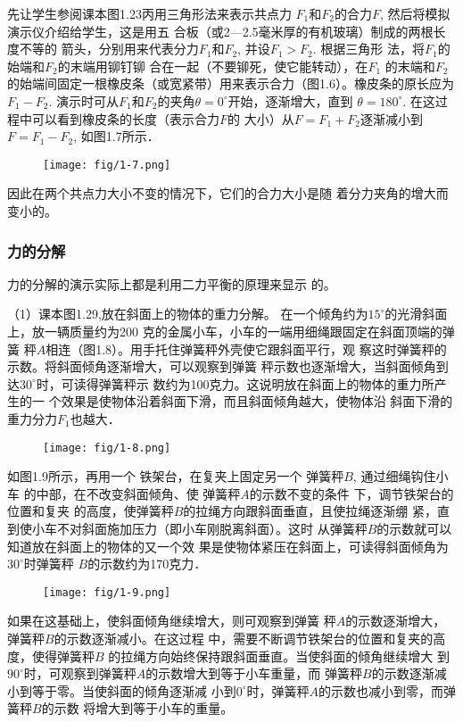 先让学生参阅课本图1.23丙用三角形法来表示共点力
$F_1$和$F_2$的合力$F$, 然后将模拟演示仪介绍给学生，这是用五
合板（或2—2.5毫米厚的有机玻璃）制成的两根长度不等的
箭头，分别用来代表分力$F_1$和$F_2$, 并设$F_1>F_2$. 根据三角形
法，将$F_1$的始端和$F_2$的末端用铆钉铆
合在一起（不要铆死，使它能转动），在$F_1$
的末端和$F_2$的始端间固定一根橡皮条（或宽紧带）用来表示合力（图1.6）。橡皮条的原长应为$F_1-F_2$. 演示时可从$F_1$和$F_2$的夹角$\theta=0^{\circ}$开始，逐渐增大，直到
$\theta=180^{\circ}$. 在这过程中可以看到橡皮条的长度（表示合力$F$的
大小）从$F=F_1+F_2$逐渐减小到$F=F_1-F_2$, 如图1.7所示．
\begin{figure}[htp]
    \centering
    \texttt{[image: fig/1-7.png]}
    \caption{}
\end{figure}
因此在两个共点力大小不变的情况下，它们的合力大小是随
着分力夹角的增大而变小的。

\subsubsection{力的分解}
力的分解的演示实际上都是利用二力平衡的原理来显示
的。

（1）课本图1.29,放在斜面上的物体的重力分解。
在一个倾角约为$15^{\circ}$的光滑斜面上，放一辆质量约为200
克的金属小车，小车的一端用细绳跟固定在斜面顶端的弹簧
秤$A$相连（图1.8）。用手托住弹簧秤外壳使它跟斜面平行，观
察这时弹簧秤的示数。将斜面倾角逐渐增大，可以观察到弹簧
秤示数也逐渐增大，当斜面倾角到达$30^{\circ}$时，可读得弹簧秤示
数约为100克力。这说明放在斜面上的物体的重力所产生的一
个效果是使物体沿着斜面下滑，而且斜面倾角越大，使物体沿
斜面下滑的重力分力$F_1$也越大．
\begin{figure}[htp]
    \centering
    \texttt{[image: fig/1-8.png]}
    \caption{}
\end{figure}

如图1.9所示，再用一个
铁架台，在复夹上固定另一个
弹簧秤$B$, 通过细绳钩住小车
的中部，在不改变斜面倾角、使
弹簧秤$A$的示数不变的条件
下，调节铁架台的位置和复夹
的高度，使弹簧秤$B$的拉绳方向跟斜面垂直，且使拉绳逐渐绷
紧，直到使小车不对斜面施加压力（即小车刚脱离斜面）。这时
从弹簧秤$B$的示数就可以知道放在斜面上的物体的又一个效
果是使物体紧压在斜面上，可读得斜面倾角为$30^{\circ}$时弹簧秤
$B$的示数约为170克力．
\begin{figure}[htp]
    \centering
    \texttt{[image: fig/1-9.png]}
    \caption{}
\end{figure}

如果在这基础上，使斜面倾角继续增大，则可观察到弹簧
秤$A$的示数逐渐增大，弹簧秤$B$的示数逐渐减小。在这过程
中，需要不断调节铁架台的位置和复夹的高度，使得弹簧秤$B$
的拉绳方向始终保持跟斜面垂直。当使斜面的倾角继续增大
到$90^{\circ}$时，可观察到弹簧秤$A$的示数增大到等于小车重量，而
弹簧秤$B$的示数逐渐减小到等于零。当使斜面的倾角逐渐减
小到$0^{\circ}$时，弹簧秤$A$的示数也减小到零，而弹簧秤$B$的示数
将增大到等于小车的重量。

